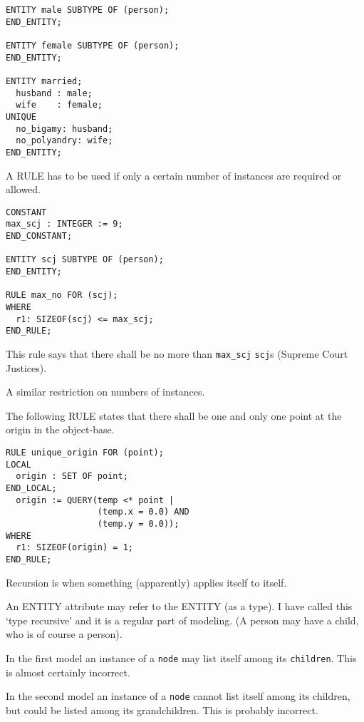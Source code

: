 
\begin{verbatim}
ENTITY male SUBTYPE OF (person);
END_ENTITY;

ENTITY female SUBTYPE OF (person);
END_ENTITY;

ENTITY married;
  husband : male;
  wife    : female;
UNIQUE
  no_bigamy: husband;
  no_polyandry: wife;
END_ENTITY;
\end{verbatim}


\begin{remarks}
\remintro
{}

    A RULE has to be used if only a certain number of instances are
required or allowed.

\remend
\end{remarks}


\begin{verbatim}
CONSTANT
max_scj : INTEGER := 9;
END_CONSTANT;

ENTITY scj SUBTYPE OF (person);
END_ENTITY;

RULE max_no FOR (scj);
WHERE
  r1: SIZEOF(scj) <= max_scj;
END_RULE;
\end{verbatim}

This rule says that there shall be no more than \verb|max_scj| \texttt{scj}s
(Supreme Court Justices).

\begin{remarks}
\remintro
{}

A similar restriction on numbers of instances.

\remend
\end{remarks}

\clearpage


The following RULE states that there shall be one and only one point at the
origin in the object-base.

\begin{verbatim}
RULE unique_origin FOR (point);
LOCAL
  origin : SET OF point;
END_LOCAL;
  origin := QUERY(temp <* point |
                  (temp.x = 0.0) AND
                  (temp.y = 0.0));
WHERE
  r1: SIZEOF(origin) = 1;
END_RULE;
\end{verbatim}


\begin{remarks}
\remintro
{}

    Recursion is when something (apparently) applies itself to itself.

An ENTITY attribute may refer to the ENTITY (as a type).
I have called this `type recursive' and it is a regular part of
modeling. (A person may have a child, who is of course a person).

In the first model an instance of a \texttt{node} may list itself
among its \texttt{children}. This is almost certainly incorrect.

In the second model an instance of a \texttt{node} cannot list
itself among its children, but could be listed among its
grandchildren. This is probably incorrect.

\remend
\end{remarks}

